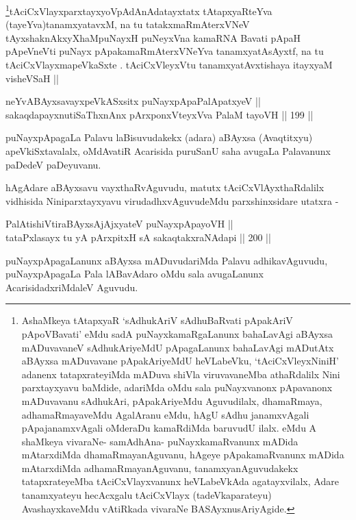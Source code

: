 \footnote{AshaMkeya tAtapxyaR `sAdhukAriV sAdhuBaRvati pApakAriV
pApoVBavati' eMdu sadA puNayxkamaRgaLanunx bahaLavAgi aBAyxsa
mADuvavaneV sAdhukAriyeMdU pApagaLanunx bahaLavAgi mADutAtx aBAyxsa
mADuvavane pApakAriyeMdU heVLabeVku, `tAciCxVleyxNiniH' adanenx
tatapxrateyiMda mADuva shiVla viruvavaneMba athaRdalilx Nini parxtayxyavu baMdide, adariMda oMdu sala puNayxvanonx pApavanonx
mADuvavanu sAdhukAri, pApakAriyeMdu Aguvudilalx, dhamaRmaya,
adhamaRmayaveMdu AgalAranu eMdu, hAgU sAdhu janamxvAgali
pApajanamxvAgali oMderaDu kamaRdiMda baruvudU ilalx. eMdu A shaMkeya
vivaraNe- samAdhAna- puNayxkamaRvanunx mADida mAtarxdiMda
dhamaRmayanAguvanu, hAgeye pApakamaRvanunx mADida mAtarxdiMda
adhamaRmayanAguvanu, tanamxyanAguvudakekx tatapxrateyeMba
tAciCxVlayxvanunx heVLabeVkAda agatayxvilalx, Adare tanamxyateyu
hecAcxgalu tAciCxVlayx (tadeVkaparateyu) AvashayxkaveMdu vAtiRkada
vivaraNe BASAyxnusAriyAgide.}tAciCxVlayxparxtayxyoVpAdAnAdatayxtatx tAtapxyaRteYva (tayeYva)\break tanamxyatavxM, na tu tatakxmaRmAterxVNeV tAyxshaknAkxyX\s \s haMpuNayxH puNeyxVna kamaRNA Bavati pApaH pApeVneVti puNayx pApakamaRmAterxVNeYva tanamxyatAsAyxtf, na tu tAciCxVlayxmapeVkaSxte . tAciCxVleyxVtu tanamxyatAvxtishaya itayxyaM visheVSaH ||


\begin{shl}
neYvABAyxsavayxpeVkASx\s sitx puNayxpApaPalApatxyeV || \\
sakaqdapayxnutiSaThxnAnx pArxponxVteyxVva PalaM tayoVH \hfill || 199 || 
\end{shl}

\begin{artha}
puNayxpApagaLa Palavu laBisuvudakekx (adara) aBAyxsa (Avaqtitxyu)
apeVkiSxtavalalx, oMdAvatiR Acarisida puruSanU saha avugaLa
Palavanunx paDedeV paDeyuvanu.
\end{artha}

\begin{artha}
hAgAdare aBAyxsavu vayxthaRvAguvudu, matutx tAciCxVlAyxthaRdalilx
vidhisida Niniparxtayxyavu virudadhxvAguvudeMdu parxshinxsidare utatxra -
\end{artha}

\begin{shl}
PalAtishiVtiraBAyxsAjAjxyateV puNayxpApayoVH || \\
tataPxlasayx tu yA pArxpitxH sA sakaqtakxraNAdapi \hfill || 200 ||  
\end{shl}

\begin{artha}
puNayxpApagaLanunx aBAyxsa mADuvudariMda Palavu adhikavAguvudu,
puNayxpApagaLa Pala lABavAdaro oMdu sala avugaLanunx
AcarisidadxriMdaleV Aguvudu.
\end{artha}

